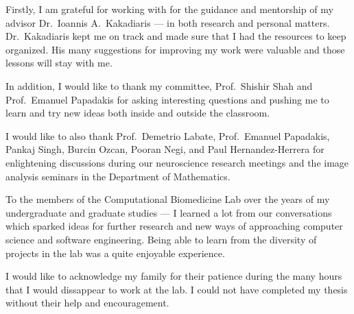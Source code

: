 \begin{acknowledgements}
	Firstly, I am grateful for working with for the guidance and mentorship
	of my advisor Dr.~Ioannis A.\ Kakadiaris --- in both research and personal
	matters. Dr.~Kakadiaris kept me on track and made sure that I had the
	resources to keep organized. His many suggestions for improving my
	work were valuable and those lessons will stay with me.

	In addition, I would like to thank my committee, Prof.~Shishir Shah and
	Prof.~Emanuel Papadakis for asking interesting questions and pushing me to
	learn and try new ideas both inside and outside the classroom.

	I would like to also thank Prof.~Demetrio Labate, Prof.~Emanuel Papadakis,
	Pankaj Singh, Burcin Ozcan, Pooran Negi, and Paul Hernandez-Herrera for
	enlightening discussions during our neuroscience research meetings and
	the image analysis seminars in the Department of Mathematics.

	To the members of the Computational Biomedicine Lab over the years
	of my undergraduate and graduate studies
	---
	I learned a lot from our conversations which sparked ideas for further
	research and new ways of approaching computer science and software engineering.
	Being able to learn from the diversity of projects in the lab was a
	quite enjoyable experience.

	I would like to acknowledge my family for their patience during the
	many hours that I would dissappear to work at the lab. I could not have
	completed my thesis without their help and encouragement.
\end{acknowledgements}

